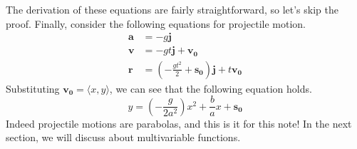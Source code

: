 \documentclass[../../../main.tex]{subfiles}
\begin{document}
The derivation of these equations are fairly straightforward, so let's
skip the proof. Finally, consider the following equations for
projectile motion.
\begin{align*}
    \mathbf{a} &= -g \mathbf{j} \\
    \mathbf{v} &= -gt \mathbf{j} + \mathbf{v_0} \\
    \mathbf{r}
    &= \left( -\frac{gt^2}{2} + \mathbf{s_0} \right) \mathbf{j}
        + t\mathbf{v_0}
\end{align*}
Substituting $\mathbf{v_0} = \langle x, y \rangle$, we can see that
the following equation holds.
\[
y = \left( -\frac{g}{2a^2} \right) x^2 + \frac{b}{a} x + \mathbf{s_0}
\]
Indeed projectile motions are parabolas, and this is it for this note!
In the next section, we will discuss about multivariable functions.
\end{document}
